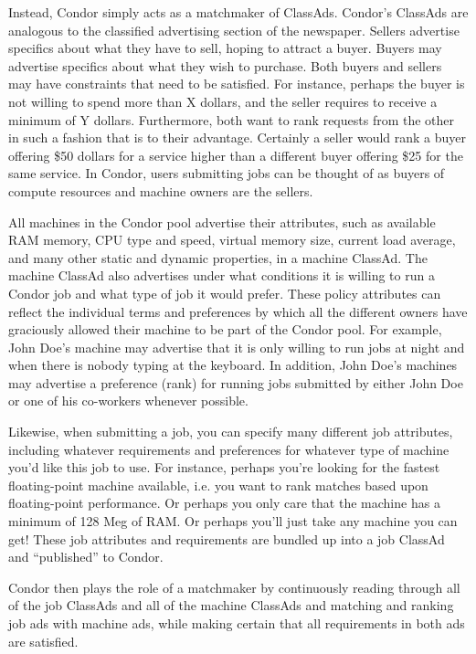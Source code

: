 Instead, Condor simply acts as a matchmaker of ClassAds. Condor's
ClassAds are analogous to the classified advertising section of the
newspaper. Sellers advertise specifics about what they have to sell,
hoping to attract a buyer. Buyers may advertise specifics about what
they wish to purchase. Both buyers and sellers may have constraints that
need to be satisfied. For instance, perhaps the buyer is not willing to
spend more than X dollars, and the seller requires to receive a minimum
of Y dollars. Furthermore, both want to rank requests from the other in
such a fashion that is to their advantage. Certainly a seller would rank
a buyer offering \$50 dollars for a service higher than a different
buyer offering \$25 for the same service. In Condor, users submitting
jobs can be thought of as buyers of compute resources and machine owners
are the sellers. 

All machines in the Condor pool advertise their attributes, such as
available RAM memory, CPU type and speed, virtual memory size, current
load average, and many other static and dynamic properties, in a machine
ClassAd. The machine ClassAd also advertises under what conditions it is
willing to run a Condor job and what type of job it would prefer. These
policy attributes can reflect the individual terms and preferences by
which all the different owners have graciously allowed their machine to
be part of the Condor pool. For example, John Doe's machine may
advertise that it is only willing to run jobs at night and when there is
nobody typing at the keyboard. In addition, John Doe's machines may
advertise a preference (rank) for running jobs submitted by either John
Doe or one of his co-workers whenever possible. 

Likewise, when submitting a job, you can specify many different job
attributes, including whatever requirements and preferences for whatever
type of machine you'd like this job to use. For instance, perhaps you're
looking for the fastest floating-point machine available, i.e. you want to
rank matches based upon floating-point performance. Or perhaps you only
care that the machine has a minimum of 128 Meg of RAM. Or perhaps you'll
just take any machine you can get! These job attributes and requirements
are bundled up into a job ClassAd and ``published'' to Condor.

Condor then plays the role of a matchmaker by continuously reading
through all of the job ClassAds and all of the machine ClassAds and
matching and ranking job ads with machine ads, while making certain that all
requirements in both ads are satisfied. 

